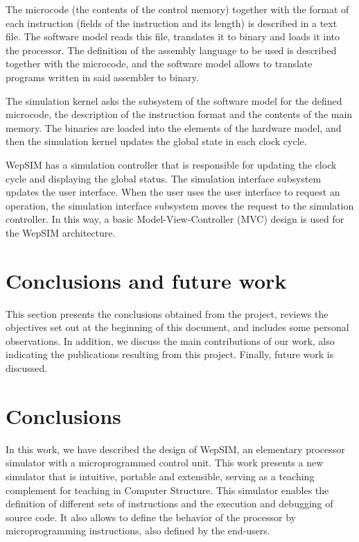 The microcode (the contents of the control memory) together with the format of each instruction (fields of the instruction and its length) is described in a text file. The software model reads this file, translates it to binary and loads it into the processor. The definition of the assembly language to be used is described together with the microcode, and the software model allows to translate programs written in said assembler to binary.


The simulation kernel asks the subsystem of the software model for the defined microcode, the description of the instruction format and the contents of the main memory. The binaries are loaded into the elements of the hardware model, and then the simulation kernel updates the global state in each clock cycle.

WepSIM has a simulation controller that is responsible for updating the clock cycle and displaying the global status. The simulation interface subsystem updates the user interface. When the user uses the user interface to request an operation, the simulation interface subsystem moves the request to the simulation controller. In this way, a basic Model-View-Controller (MVC) design is used for the WepSIM architecture.

\section*{Conclusions and future work}

This section presents the conclusions obtained from the project, reviews the objectives set out at the beginning of this document, and includes some personal observations. In addition, we discuss the main contributions of our work, also indicating the publications resulting from this project. Finally, future work is discussed.

\section*{Conclusions}

In this work, we have described the design of WepSIM, an elementary processor simulator with a microprogrammed control unit. This work presents a new simulator that is intuitive, portable and extensible, serving as a teaching complement for teaching in Computer Structure. This simulator enables the definition of different sets of instructions and the execution and debugging of source code. It also allows to define the behavior of the processor by microprogramming instructions, also defined by the end-users.

